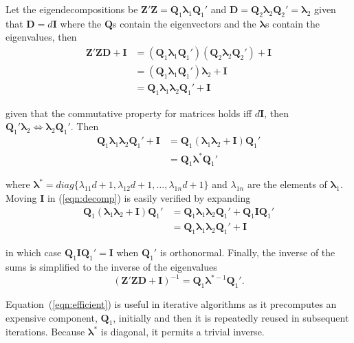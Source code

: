 \documentclass[12pt]{article}
\begin{document}
Let the eigendecompositions be $\bm{Z}'\bm{Z} = \bm{Q}_1 \bm{\lambda}_1 \bm{Q}_1'$ and $\bm{D}=\bm{Q}_2 \bm{\lambda}_2 \bm{Q}_2'= \bm{\lambda}_2$ given that $\bm{D}=d\bm{I}$ where the $\bm{Q}$s contain the eigenvectors and the $\bm{\lambda}$s contain the eigenvalues, then
\begin{align}
\bm{Z}'\bm{Z}\bm{D} + \bm{I} & = (\bm{Q}_1 \bm{\lambda}_1 \bm{Q}_1')(\bm{Q}_2 \bm{\lambda}_2 \bm{Q}_2') + \bm{I}\\
		& = (\bm{Q}_1 \bm{\lambda}_1 \bm{Q}_1')\bm{\lambda}_2 + \bm{I}\\
		&= \bm{Q}_1 \bm{\lambda}_1\bm{\lambda}_2 \bm{Q}_1' + \bm{I}
\end{align}

\noindent given that the commutative property for matrices holds iff $d\bm{I}$, then $\bm{Q}_1'\bm{\lambda}_2 \Longleftrightarrow \bm{\lambda}_2\bm{Q}_1'$. Then
\begin{align}
\bm{Q}_1 \bm{\lambda}_1\bm{\lambda}_2 \bm{Q}_1' + \bm{I}	&= \bm{Q}_1 (\bm{\lambda}_1\bm{\lambda}_2+ \bm{I}) \bm{Q}_1' \label{eqn:decomp}\\
		&= \bm{Q}_1 \bm{\lambda}^* \bm{Q}_1'
\end{align}

\noindent where $\bm{\lambda}^* = diag\{\lambda_{11}d+1, \lambda_{12}d+1, \ldots, \lambda_{1n}d+1\}$ and $\lambda_{1n}$ are the elements of $\bm{\lambda}_1$. Moving $\bm{I}$ in (\ref{eqn:decomp}) is easily verified by expanding
\begin{align}
\bm{Q}_1 (\bm{\lambda}_1\bm{\lambda}_2 + \bm{I}) \bm{Q}_1' &= \bm{Q}_1 \bm{\lambda}_1\bm{\lambda}_2\bm{Q}_1' + \bm{Q}_1\bm{I}\bm{Q}_1'\\
		&=\bm{Q}_1 \bm{\lambda}_1\bm{\lambda}_2\bm{Q}_1' + \bm{I}
\end{align}

\noindent in which case $\bm{Q}_1\bm{I}\bm{Q}_1'=\bm{I}$ when $\bm{Q}_1'$ is orthonormal. Finally, the inverse of the sums is simplified to the inverse of the eigenvalues 
\begin{equation}
\label{eqn:efficient}
(\bm{Z}'\bm{Z}\bm{D} + \bm{I})^{-1} = \bm{Q}_1 \bm{\lambda}^{*-1} \bm{Q}_1'.
\end{equation}

Equation~(\ref{eqn:efficient}) is useful in iterative algorithms as it precomputes an expensive component, $\bm{Q}_1$, initially and then it is repeatedly reused in subsequent iterations. Because $\bm{\lambda}^*$ is diagonal, it permits a trivial inverse. 
\end{document}
